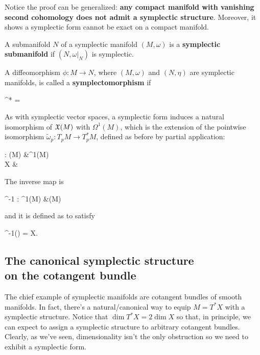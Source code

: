 \documentclass[main.tex]{subfiles}
\begin{document}
\begin{remark}
	Notice the proof can be generalized: \textbf{any compact manifold with vanishing second cohomology does not admit a symplectic structure}. Moreover, it shows a symplectic form cannot be exact on a compact manifold.
\end{remark}

\begin{definition}
	A submanifold $N$ of a symplectic manifold $(M, \omega)$ is a \textbf{symplectic submanifold} if $(N, \omega\vert_N)$ is symplectic.
\end{definition}
\begin{definition}
	A diffeomorphism $\phi : M \to N$, where $(M, \omega)$ and $(N, \eta)$ are symplectic manifolds, is called a \textbf{symplectomorphism} if
	\begin{eqalign}
		\phi^* \eta = \omega
	\end{eqalign}
\end{definition}

\begin{remark}
\label{rmk:inverse_ipr}
	As with symplectic vector spaces, a symplectic form induces a natural isomorphism of $\mathfrak{X}(M)$ with $\Omega^1(M)$, which is the extension of the pointwise isomorphism $\tilde\omega_p : T_pM \to T^*_pM$, defined as before by partial application:
	\begin{eqalign}
		\omega : \fields(M) &\longto \Omega^1(M)\\
				X &\longmapsto \ipr{X}\omega
	\end{eqalign}
	The inverse map is
	\begin{eqalign}
		\omega^{-1} : \Omega^1(M) &\longto \fields(M)
	\end{eqalign}
	and it is defined as to satisfy
	\begin{eqalign}
		\omega^{-1}(\omega) = X.
	\end{eqalign}
\end{remark}

\subsection[The canonical symplectic structure on the cotangent bundle]{The canonical symplectic structure\\on the cotangent bundle}
The chief example of symplectic manifolds are cotangent bundles of smooth manifolds. In fact, there's a natural/canonical way to equip $M= T^*X$ with a symplectic structure. Notice that $\dim T^*X = 2\dim X$ so that, in principle, we can expect to assign a symplectic structure to arbitrary cotangent bundles. Clearly, as we've seen, dimensionality isn't the only obstruction so we need to exhibit a symplectic form.
\end{document}
